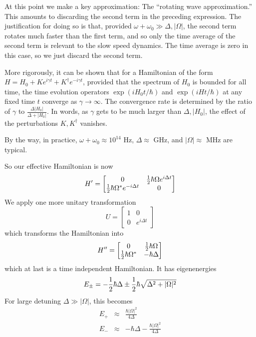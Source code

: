 \documentclass[aps,prb,floatfix,amsmath,amssymb,groupedaddress]{revtex4}
\begin{document}
At this point we make a key approximation: The ``rotating wave approximation.''  This amounts to discarding the second term in the preceding expression.  The justification for doing so is that, provided $\omega + \omega_0 \gg \Delta, |\Omega|$, the second term rotates much faster than the first term, and so only the time average of the second term is relevant to the slow speed dynamics.  The time average is zero in this case, so we just discard the second term.  

More rigorously, it can be shown that for a Hamiltonian of the form $H = H_0 + K e^{i \gamma t} + K^\dagger e^{-i \gamma t}$, provided that the spectrum of $H_0$ is bounded for all time, the time evolution operators $\exp(iH_0 t/\hbar)$ and $\exp(iHt/\hbar)$ at any fixed time $t$ converge as $\gamma\rightarrow \infty$.  The convergence rate is determined by the ratio of $\gamma$ to $\frac{\Delta |H_0|}{\Delta + |H_0|}$.  In words, as $\gamma$ gets to be much larger than $\Delta, |H_0|$, the effect of the perturbations $K, K^\dagger$ vanishes. 

By the way, in practice, $\omega+\omega_0 \approx 10^{14}$ Hz, $\Delta\approx $ GHz, and $|\Omega|\approx$ MHz are typical.  

So our effective Hamiltonian is now $$H' = 
\begin{bmatrix}
0 & {\frac{1}{2}} \hbar\Omega e^{i\Delta t} \\
{\frac{1}{2}}\hbar \Omega^* e^{-i\Delta t} & 0
\end{bmatrix}
$$
We apply one more unitary transformation $$U = 
\begin{bmatrix}
1 & 0 \\
0 & e^{i\Delta t}
\end{bmatrix}
$$ 
which transforms the Hamiltonian into $$H'' = 
\begin{bmatrix}
0 & {\frac{1}{2}} \hbar\Omega \\
{\frac{1}{2}} \hbar \Omega^* & -\hbar\Delta
\end{bmatrix}
$$ 
which at last is a time independent Hamiltonian.  It has eigenenergies
\begin{equation}
E_{\pm} = -{\frac{1}{2}} \hbar \Delta \pm {\frac{1}{2}} \hbar \sqrt{\Delta^2 + |\Omega|^2}
\label{eigs}
\end{equation}
For large detuning $\Delta \gg |\Omega|$, this becomes
\begin{eqnarray}
E_+ & \approx & \frac{\hbar |\Omega|^2}{4\Delta} \\ \nonumber
E_- & \approx & -\hbar \Delta - \frac{\hbar |\Omega|^2}{4\Delta}
\end{eqnarray}
\end{document}
